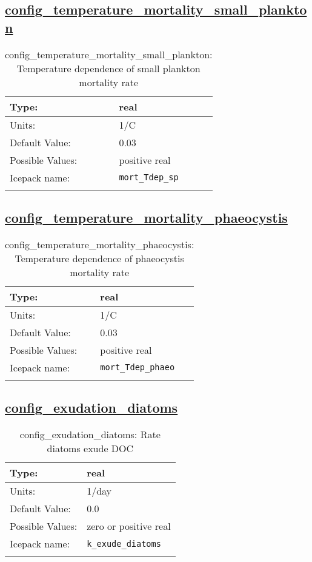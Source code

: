 \subsection[config\_temperature\_mortality\_small\_plankton]{\hyperref[sec:nm_tab_biogeochemistry]{config\_temperature\_mortality\_small\_plankton}}
\label{subsec:nm_sec_config_temperature_mortality_small_plankton}
\begin{center}
\begin{longtable}{| p{2.0in} || p{4.0in} |}
    \hline
    Type: & real \\
    \hline
    Units: & \si{1/C} \\
    \hline
    Default Value: & 0.03 \\
    \hline
    Possible Values: & positive real \\
    \hline
    \hline
    Icepack name: & \verb+mort_Tdep_sp+ \\
    \caption{config\_temperature\_mortality\_small\_plankton: Temperature dependence of small plankton mortality rate}
\end{longtable}
\end{center}
\subsection[config\_temperature\_mortality\_phaeocystis]{\hyperref[sec:nm_tab_biogeochemistry]{config\_temperature\_mortality\_phaeocystis}}
\label{subsec:nm_sec_config_temperature_mortality_phaeocystis}
\begin{center}
\begin{longtable}{| p{2.0in} || p{4.0in} |}
    \hline
    Type: & real \\
    \hline
    Units: & \si{1/C} \\
    \hline
    Default Value: & 0.03 \\
    \hline
    Possible Values: & positive real \\
    \hline
    \hline
    Icepack name: & \verb+mort_Tdep_phaeo+ \\
    \caption{config\_temperature\_mortality\_phaeocystis: Temperature dependence of phaeocystis mortality rate}
\end{longtable}
\end{center}
\subsection[config\_exudation\_diatoms]{\hyperref[sec:nm_tab_biogeochemistry]{config\_exudation\_diatoms}}
\label{subsec:nm_sec_config_exudation_diatoms}
\begin{center}
\begin{longtable}{| p{2.0in} || p{4.0in} |}
    \hline
    Type: & real \\
    \hline
    Units: & \si{1/day} \\
    \hline
    Default Value: & 0.0 \\
    \hline
    Possible Values: & zero or positive real \\
    \hline
    \hline
    Icepack name: & \verb+k_exude_diatoms+ \\
    \caption{config\_exudation\_diatoms: Rate diatoms exude DOC}
\end{longtable}
\end{center}
